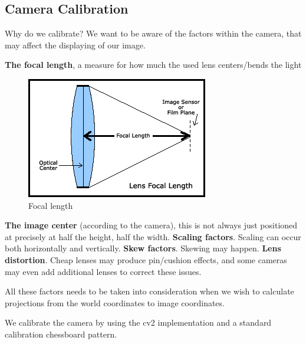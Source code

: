 \subsection{Camera Calibration}

Why do we calibrate?
We want to be aware of the factors within the camera, that may affect the
displaying of our  image.

\textbf{The focal length}, a measure for how much the used lens
centers/bends the light

\begin{figure}[!htbp]
\includegraphics{pics/focal_length.png}
\caption{Focal length}
\label{fig:focal_length}
\end{figure}

\textbf{The image center} (according to the camera), this is not always just
positioned at precisely at half the height, half the width.
\textbf{Scaling factors}. Scaling can occur both horizontally and vertically. 
\textbf{Skew factors}.  Skewing may happen.
\textbf{Lens distortion}.  Cheap lenses may produce pin/cushion effects, and some
cameras may even add additional lenses to correct these issues.

All these factors needs to be taken into consideration when we wish to
calculate projections from the world coordinates to image coordinates. 

We calibrate the camera by using the cv2 implementation and a standard
calibration chessboard pattern. 
